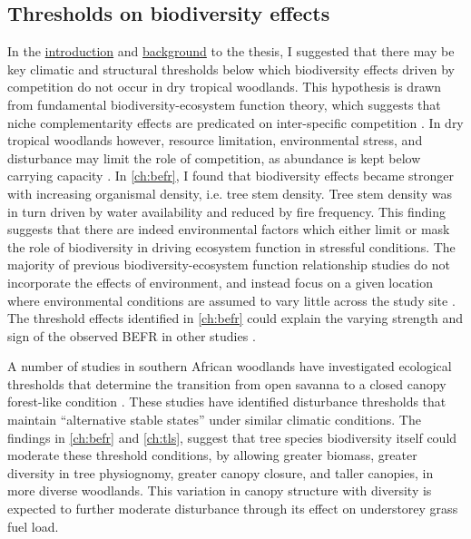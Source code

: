 \begin{refsection}

\subsection{Thresholds on biodiversity effects}
\label{discussion:ssec:thresholds}

In the \hyperref[ch:intro]{introduction} and \hyperref[ch:background]{background} to the thesis, I suggested that there may be key climatic and structural thresholds below which biodiversity effects driven by competition do not occur in dry tropical woodlands. This hypothesis is drawn from fundamental biodiversity-ecosystem function theory, which suggests that niche complementarity effects are predicated on inter-specific competition \citep{Isbell2013}. In dry tropical woodlands however, resource limitation, environmental stress, and disturbance may limit the role of competition, as abundance is kept below carrying capacity \citep{Sankaran2005}. In \autoref{ch:befr}, I found that biodiversity effects became stronger with increasing organismal density, i.e. tree stem density. Tree stem density was in turn driven by water availability and reduced by fire frequency. This finding suggests that there are indeed environmental factors which either limit or mask the role of biodiversity in driving ecosystem function in stressful conditions. The majority of previous biodiversity-ecosystem function relationship studies do not incorporate the effects of environment, and instead focus on a given location where environmental conditions are assumed to vary little across the study site \citep{Cardinale2009, Plas2019}. The threshold effects identified in \autoref{ch:befr} could explain the varying strength and sign of the observed BEFR in other studies \citep{Liang2016}.

A number of studies in southern African woodlands have investigated ecological thresholds that determine the transition from open savanna to a closed canopy forest-like condition \citep{Staver2011, Hirota2011, Staver2017}. These studies have identified disturbance thresholds that maintain ``alternative stable states'' under similar climatic conditions. The findings in \autoref{ch:befr} and \autoref{ch:tls}, suggest that tree species biodiversity itself could moderate these threshold conditions, by allowing greater biomass, greater diversity in tree physiognomy, greater canopy closure, and taller canopies, in more diverse woodlands. This variation in canopy structure with diversity is expected to further moderate disturbance through its effect on understorey grass fuel load.


\end{refsection}
